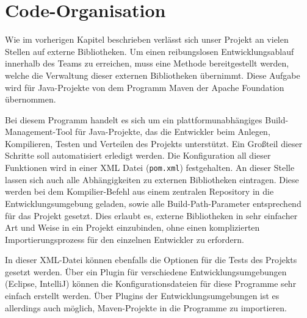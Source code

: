 \section{Code-Organisation}
Wie im vorherigen Kapitel beschrieben verlässt sich unser Projekt an vielen Stellen %
auf externe Bibliotheken. Um einen reibungslosen Entwicklungsablauf innerhalb des Teams 
zu erreichen, muss eine Methode bereitgestellt werden, welche die Verwaltung dieser 
externen Bibliotheken übernimmt. Diese Aufgabe wird für Java-Projekte von dem 
Programm Maven der Apache Foundation übernommen. 

Bei diesem Programm handelt es sich um ein plattformunabhängiges Build-Management-Tool 
für Java-Projekte, das die Entwickler beim Anlegen, Kompilieren, Testen und 
Verteilen des Projekts unterstützt. Ein Großteil dieser Schritte soll automatisiert 
erledigt werden. Die Konfiguration all dieser Funktionen wird in einer XML Datei 
(\texttt{pom.xml}) festgehalten. An dieser Stelle lassen sich auch alle Abhängigkeiten zu 
externen Bibliotheken eintragen. Diese werden bei dem Kompilier-Befehl aus einem 
zentralen Repository in die Entwicklungsumgebung geladen, sowie alle Build-Path-Parameter entsprechend für das Projekt gesetzt. Dies erlaubt es, externe Bibliotheken 
in sehr einfacher Art und Weise in ein Projekt einzubinden, ohne einen komplizierten 
Importierungsprozess für den einzelnen Entwickler zu erfordern.

In dieser XML-Datei können ebenfalls die Optionen für die Tests des Projekts gesetzt 
werden. Über ein Plugin für verschiedene Entwicklungsumgebungen (Eclipse, IntelliJ) 
können die Konfigurationsdateien für diese Programme sehr einfach erstellt werden. 
Über Plugins der Entwicklungsumgebungen ist es allerdings auch möglich, Maven-Projekte 
in die Programme zu importieren. 

